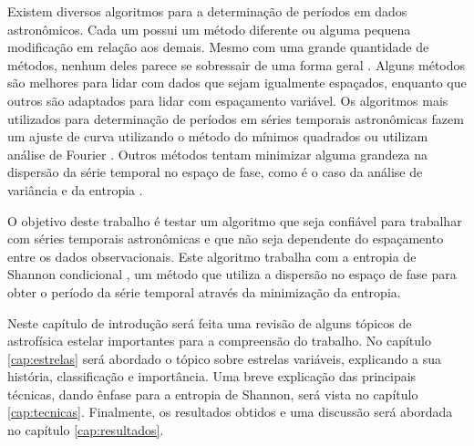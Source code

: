 Existem diversos algoritmos para a determinação de períodos em dados astronômicos. Cada um possui um método diferente ou alguma pequena modificação em relação aos demais. Mesmo com uma grande quantidade de métodos, nenhum deles parece se sobressair de uma forma geral \citep{comparison}. Alguns métodos são melhores para lidar com dados que sejam igualmente espaçados, enquanto que outros são adaptados para lidar com espaçamento variável. Os algoritmos mais utilizados para determinação de períodos em séries temporais astronômicas fazem um ajuste de curva utilizando o método do mínimos quadrados \citep{lomb} ou utilizam análise de Fourier \citep{mello81}. Outros métodos tentam minimizar alguma grandeza na dispersão da série temporal no espa\c{c}o de fase, como é o caso da análise de variância \citep{aov} e da entropia \citep{entropy}.



O objetivo deste trabalho é testar um algoritmo que seja confiável para trabalhar com séries temporais astronômicas e que não seja dependente do espaçamento entre os dados observacionais. Este algoritmo trabalha com a entropia de Shannon condicional \citep{ce, Cincotta1999}, um método que utiliza a dispersão no espaço de fase para obter o período da série temporal através da minimização da entropia.


Neste capítulo de introdução será feita uma revisão de alguns tópicos de astrofísica estelar importantes para a compreensão do trabalho. No capítulo \ref{cap:estrelas} será abordado o tópico sobre estrelas variáveis, explicando a sua história, classificação e importância. Uma breve explicação das principais técnicas, dando ênfase para a entropia de Shannon, será vista no capítulo \ref{cap:tecnicas}. Finalmente, os resultados obtidos e uma discussão será abordada no capítulo \ref{cap:resultados}.

